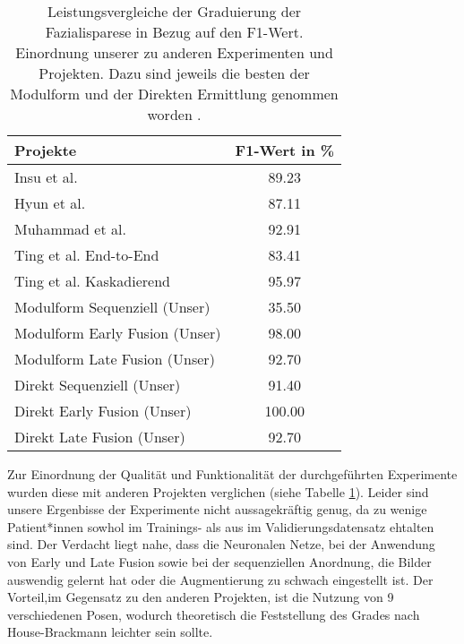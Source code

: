 \begin{table}[!h]\vspace{1ex}\centering
  \begin{tabular}{l||c|}
  \textbf{Projekte}                           & \textbf{F1-Wert in \%} \\ \hline\hline
  Insu et al. \cite{6583060}                    & 89.23   \\
  Hyun et al. \cite{s151026756}                 & 87.11   \\
  Muhammad et al. \cite{sym10070242}            & 92.91   \\
  Ting et al. End-to-End \cite{detection_fp2}   & 83.41   \\
  Ting et al. Kaskadierend \cite{detection_fp2} & 95.97   \\ \hline
  Modulform Sequenziell (Unser)                 & 35.50   \\
  Modulform Early Fusion (Unser)                & 98.00   \\
  Modulform Late Fusion (Unser)                 & 92.70   \\
  Direkt Sequenziell (Unser)                    & 91.40   \\
  Direkt Early Fusion (Unser)                   & 100.00  \\
  Direkt Late Fusion (Unser)                    & 92.70   \\ \hline
  \end{tabular}
  \caption[Leistungsvergleiche der Graduierung der Fazialisparese von verschiedenen Projekten]{Leistungsvergleiche der Graduierung der Fazialisparese in Bezug auf den F1-Wert. Einordnung unserer zu anderen Experimenten und Projekten. Dazu sind jeweils die besten der Modulform und der Direkten Ermittlung genommen worden \cite{detection_fp2}.}\label{cap:ref_tab}
\vspace{1ex}\end{table}\label{table:ref_tab}

\clearpage

Zur Einordnung der Qualität und Funktionalität der durchgeführten Experimente wurden diese mit anderen Projekten verglichen (siehe Tabelle \ref{cap:ref_tab}). Leider sind unsere Ergenbisse der Experimente nicht aussagekräftig genug, da zu wenige Patient*innen sowhol im Trainings- als aus im Validierungsdatensatz ehtalten sind. Der Verdacht liegt nahe, dass die Neuronalen Netze, bei der Anwendung von Early und Late Fusion sowie bei der sequenziellen Anordnung, die Bilder auswendig gelernt hat oder die Augmentierung zu schwach eingestellt ist. Der Vorteil,im Gegensatz zu den anderen Projekten, ist die Nutzung von 9 verschiedenen Posen, wodurch theoretisch die Feststellung des Grades nach House-Brackmann leichter sein sollte.
